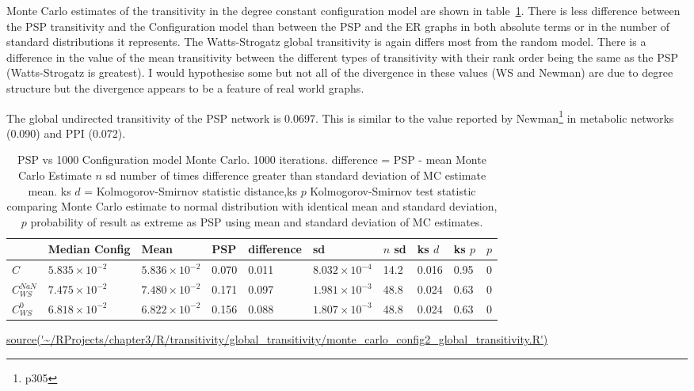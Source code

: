 Monte Carlo estimates of the transitivity in the degree constant configuration model are shown in table~\ref{tab: MC estimate of config transitivity}. There is less difference between the PSP transitivity and the Configuration model than between the PSP and the ER graphs in both absolute terms or in the number of standard distributions it represents. The Watts-Strogatz global transitivity is again differs most from the random model. There is a difference in the value of the mean transitivity between the different types of transitivity with their rank order being the same as the PSP (Watts-Strogatz is greatest). I would hypothesise some but not all of the divergence in these values (WS and Newman) are due to degree structure but the divergence appears to be a feature of real world graphs. 

The global undirected transitivity of the PSP network is 0.0697. This is similar to the value reported by Newman\footnote{p305} \cite{newman2018networks} in metabolic networks (0.090) and PPI (0.072).
\begin{table}[ht]
\centering
\begin{adjustbox}{width=\textwidth}

\setlength{\extrarowheight}{2pt}
\begin{tabular}{llllllllll}
  \toprule
 & Median Config & Mean & PSP & difference & sd & $n$ sd & ks $d$ & ks $p$ & $p$ \\ 
  \midrule
$C$  & $5.835 \times 10^{-2}$ & $5.836 \times 10^{-2}$ & 0.070 & 0.011 & $8.032 \times 10^{-4}$ & 14.2 & 0.016 & 0.95 & 0 \\ 
   $C_{WS}^{NaN}$  & $7.475 \times 10^{-2}$ & $7.480 \times 10^{-2}$ & 0.171 & 0.097 & $1.981 \times 10^{-3}$ & 48.8 & 0.024 & 0.63 & 0 \\ 
   $C_{WS}^0$ & $6.818 \times 10^{-2}$ & $6.822 \times 10^{-2}$ & 0.156 & 0.088 & $1.807 \times 10^{-3}$ & 48.8 & 0.024 & 0.63 & 0 \\ 
   \bottomrule
\end{tabular}
\end{adjustbox}
\caption[Transitivity PSP compared with configuration model]{PSP vs 1000 Configuration model Monte Carlo. 1000 iterations. difference  = PSP - mean Monte Carlo Estimate $n$ sd number of times difference greater than standard deviation of MC estimate mean. ks $d$ = Kolmogorov-Smirnov statistic distance,ks $p$ Kolmogorov-Smirnov test statistic comparing Monte Carlo estimate to normal distribution with identical mean and standard deviation,  $p$ probability of result as extreme as PSP using mean and standard deviation of MC estimates. }
\tiny\url{source('~/RProjects/chapter3/R/transitivity/global_transitivity/monte_carlo_config2_global_transitivity.R')}
\label{tab: MC estimate of config transitivity}
\end{table}





